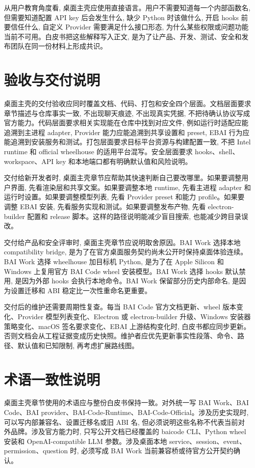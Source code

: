 从用户教育角度看, 桌面主壳应使用直接语言。用户不需要知道每一个内部函数名, 但需要知道配置 API key 后会发生什么, 缺少 Python 时该做什么, 开启 hooks 前要信任什么, 自定义 Provider 需要满足什么接口形态, 为什么某些权限或问题功能当前不可用。白皮书把这些解释写入正文, 是为了让产品、开发、测试、安全和发布团队在同一份材料上形成共识。

\section{验收与交付说明}
桌面主壳的交付验收应同时覆盖文档、代码、打包和安全四个层面。文档层面要求章节描述与仓库事实一致, 不出现聊天痕迹, 不出现真实凭据, 不把待确认协议写成官方能力。代码层面要求相关实现能在仓库中找到对应文件, 例如运行时适配应能追溯到主进程 adapter, Provider 能力应能追溯到共享设置和 preset, EBAI 行为应能追溯到安装服务和测试。打包层面要求目标平台资源与构建配置一致, 不把 Intel runtime 和 official wheelhouse 的适用平台混写。安全层面要求 hooks、shell、workspace、API key 和本地端口都有明确默认值和风险说明。

交付给新开发者时, 桌面主壳章节应帮助其快速判断自己要改哪里。如果要调整用户界面, 先看渲染层和共享文案。如果要调整本地 runtime, 先看主进程 adapter 和运行时设置。如果要调整模型列表, 先看 Provider preset 和能力 profile。如果要调整 EBAI 安装, 先看服务实现和测试。如果要调整发布产物, 先看 electron-builder 配置和 release 脚本。这样的路径说明能减少盲目搜索, 也能减少跨目录误改。

交付给产品和安全评审时, 桌面主壳章节应说明取舍原因。BAI Work 选择本地 compatibility bridge, 是为了在官方桌面服务契约尚未公开时保持桌面体验连续。BAI Work 选择 wheelhouse 加目标机 Python, 是为了在 Apple Silicon 和 Windows 上复用官方 BAI Code wheel 安装模型。BAI Work 选择 hooks 默认禁用, 是因为外部 hooks 会执行本地命令。BAI Work 保留部分历史内部命名, 是因为设置迁移和 ABI 稳定比一次性重命名更重要。

交付后的维护还需要周期性复查。每当 BAI Code 官方文档更新、wheel 版本变化、Provider 模型列表变化、Electron 或 electron-builder 升级、Windows 安装器策略变化、macOS 签名要求变化、EBAI 上游结构变化时, 白皮书都应同步更新。否则文档会从工程证据变成历史快照。维护者应优先更新事实性段落、命令、路径、默认值和已知限制, 再考虑扩展路线图。

\section{术语一致性说明}
桌面主壳章节使用的术语应与整份白皮书保持一致。对外统一写 BAI Work、BAI Code、BAI provider、BAI-Code-Runtime、BAI-Code-Official。涉及历史实现时, 可以写内部兼容名、设置迁移名或旧 ABI 名, 但必须说明这些名称不代表当前对外品牌。涉及官方能力时, 只写公开文档已经覆盖的 baicode CLI、Python wheel 安装和 OpenAI-compatible LLM 参数。涉及桌面本地 service、session、event、permission、question 时, 必须写成 BAI Work 当前兼容桥或待官方公开契约确认。

